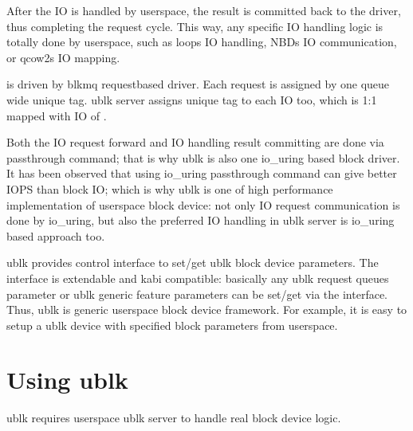 \documentclass[a4paper,11pt,english]{sphinxmanual}
\begin{document}
After the IO is handled by userspace, the result is committed back to the
driver, thus completing the request cycle. This way, any specific IO handling
logic is totally done by userspace, such as loop\textquotesingle{}s IO handling, NBD\textquotesingle{}s IO
communication, or qcow2\textquotesingle{}s IO mapping.

 is driven by blk\sphinxhyphen{}mq request\sphinxhyphen{}based driver. Each request is
assigned by one queue wide unique tag. ublk server assigns unique tag to each
IO too, which is 1:1 mapped with IO of .

Both the IO request forward and IO handling result committing are done via
 passthrough command; that is why ublk is also one io\_uring based
block driver. It has been observed that using io\_uring passthrough command can
give better IOPS than block IO; which is why ublk is one of high performance
implementation of userspace block device: not only IO request communication is
done by io\_uring, but also the preferred IO handling in ublk server is io\_uring
based approach too.

ublk provides control interface to set/get ublk block device parameters.
The interface is extendable and kabi compatible: basically any ublk request
queue\textquotesingle{}s parameter or ublk generic feature parameters can be set/get via the
interface. Thus, ublk is generic userspace block device framework.
For example, it is easy to setup a ublk device with specified block
parameters from userspace.


\section{Using ublk}
\label{\detokenize{ublk:using-ublk}}
ublk requires userspace ublk server to handle real block device logic.
\end{document}
